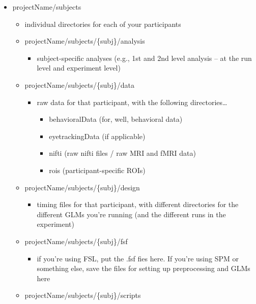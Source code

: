 \documentclass[
]{book}
\providecommand{\tightlist}{%
  \setlength{\itemsep}{0pt}\setlength{\parskip}{0pt}}
\begin{document}
\begin{itemize}
\tightlist
\item
  projectName/subjects

  \begin{itemize}
  \tightlist
  \item
    individual directories for each of your participants
  \item
    projectName/subjects/\{subj\}/analysis

    \begin{itemize}
    \tightlist
    \item
      subject-specific analyses (e.g., 1st and 2nd level analysis -- at the run level and experiment level)
    \end{itemize}
  \item
    projectName/subjects/\{subj\}/data

    \begin{itemize}
    \tightlist
    \item
      raw data for that participant, with the following directories\ldots{}

      \begin{itemize}
      \tightlist
      \item
        behavioralData (for, well, behavioral data)
      \item
        eyetrackingData (if applicable)
      \item
        nifti (raw nifti files / raw MRI and fMRI data)
      \item
        rois (participant-specific ROIs)
      \end{itemize}
    \end{itemize}
  \item
    projectName/subjects/\{subj\}/design

    \begin{itemize}
    \tightlist
    \item
      timing files for that participant, with different directories for the different GLMs you're running (and the different runs in the experiment)
    \end{itemize}
  \item
    projectName/subjects/\{subj\}/fsf

    \begin{itemize}
    \tightlist
    \item
      if you're using FSL, put the .fsf fies here. If you're using SPM or something else, save the files for setting up preprocessing and GLMs here
    \end{itemize}
  \item
    projectName/subjects/\{subj\}/scripts


\end{itemize}
\end{itemize}
\end{document}

